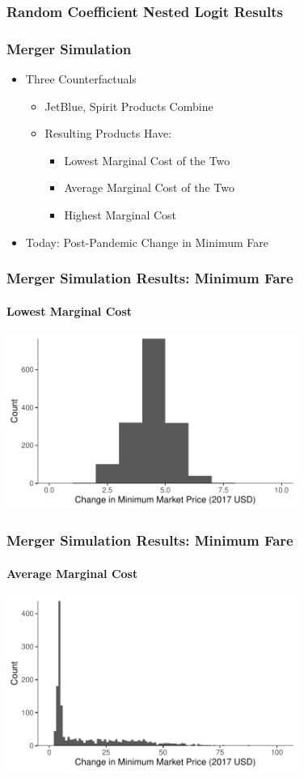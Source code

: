 \documentclass[xcolor=dvipsnames]{beamer}
\begin{document}
	\begin{frame}
		\frametitle{Random Coefficient Nested Logit Results}
		\resizebox*{2.35in}{!}{
			
	}
		
	\end{frame}
	
	\begin{frame}
		\frametitle{Merger Simulation}
		\begin{itemize}
			\item Three Counterfactuals
			\begin{itemize}
				\item JetBlue, Spirit Products Combine
				\item Resulting Products Have:
				\begin{itemize}
					\item Lowest Marginal Cost of the Two
					\item Average Marginal Cost of the Two
					\item Highest Marginal Cost
				\end{itemize}
			\end{itemize}
			\item Today: Post-Pandemic Change in Minimum Fare
		\end{itemize}
	\end{frame}
	
	\begin{frame}
		\frametitle{Merger Simulation Results: Minimum Fare}
		\framesubtitle{Lowest Marginal Cost}
		\includegraphics[width = 3.75in]{Merger_Change_MinimumFare_BestCase.pdf}
	\end{frame}
		
	\begin{frame}
			\frametitle{Merger Simulation Results: Minimum Fare}
			\framesubtitle{Average Marginal Cost}
			\includegraphics[width = 3.75in]{Merger_Change_MinimumFare_AverageCase.pdf}
		\end{frame}
		
\end{document}
